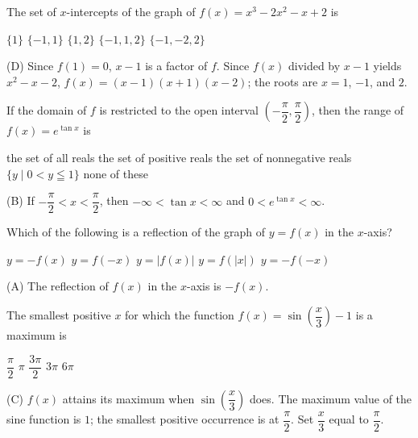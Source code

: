 \question
The set of $x$-intercepts of the graph of $f(x)=x^{3}-2 x^{2}-x+2$ is
\begin{choices}
  \choice $\{1\}$
  \choice $\{-1,1\}$
  \choice $\{1,2\}$
  \CorrectChoice $\{-1,1,2\}$
  \choice $\{-1,-2,2\}$
\end{choices}
\begin{solution}
(D) Since $f(1)=0$, $x-1$ is a factor of $f$. Since $f(x)$ divided by $x-1$ yields $x^{2}-x-2$, $f(x)=(x-1)(x+1)(x-2)$; the roots are $x=1$, $-1$, and $2$.
\end{solution}

\question
If the domain of $f$ is restricted to the open interval $\left(-\dfrac{\pi}{2}, \dfrac{\pi}{2}\right)$, then the range of $f(x)=e^{\tan x}$ is
\begin{choices}
  \choice the set of all reals
  \CorrectChoice the set of positive reals
  \choice the set of nonnegative reals
  \choice $\{y \mid 0<y \leqq 1\}$
  \choice none of these
\end{choices}
\begin{solution}
(B) If $-\dfrac{\pi}{2}<x<\dfrac{\pi}{2}$, then $-\infty<\tan x<\infty$ and $0<e^{\tan x}<\infty$.
\end{solution}





\newpage



\question
Which of the following is a reflection of the graph of $y=f(x)$ in the $x$-axis?
\begin{choices}
  \CorrectChoice $y=-f(x)$
  \choice $y=f(-x)$
  \choice $y=|f(x)|$
  \choice $y=f(|x|)$
  \choice $y=-f(-x)$
\end{choices}
\begin{solution}
(A) The reflection of $f(x)$ in the $x$-axis is $-f(x)$.
\end{solution}

\question
The smallest positive $x$ for which the function $f(x)=\sin \left(\dfrac{x}{3}\right)-1$ is a maximum is
\begin{choices}
  \choice $\dfrac{\pi}{2}$
  \choice $\pi$
  \CorrectChoice $\dfrac{3 \pi}{2}$
  \choice $3 \pi$
  \choice $6 \pi$
\end{choices}
\begin{solution}
(C) $f(x)$ attains its maximum when $\sin \left(\dfrac{x}{3}\right)$ does. The maximum value of the sine function is $1$; the smallest positive occurrence is at $\dfrac{\pi}{2}$. Set $\dfrac{x}{3}$ equal to $\dfrac{\pi}{2}$.
\end{solution}

